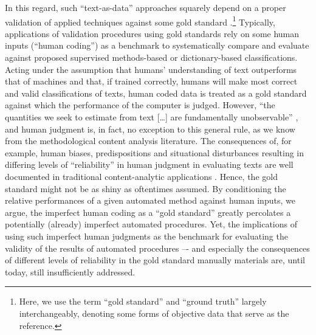 \documentclass[man, 12pt, a4paper, nolmodern, noextraspace]{apa6}
\begin{document}
    In this regard, such \enquote{text-as-data} approaches squarely depend on a proper validation of applied techniques against some gold standard \parencite{grimmer2013text}.\footnote{ Here, we use the term \enquote{gold standard} and \enquote{ground truth} largely interchangeably, denoting some forms of objective data that serve as the reference.} Typically, applications of validation procedures using gold standards rely on some human inputs (\enquote{human coding}) as a  benchmark to systematically compare and evaluate against proposed supervised methods-based or dictionary-based classifications. Acting under the assumption that humans’ understanding of text outperforms that of machines and that, if trained correctly, humans will make most correct and valid classifications of texts, human coded data is treated as a gold standard against which the performance of the computer is judged. However, “the quantities we seek to estimate from text [\ldots] are fundamentally unobservable” \parencite[p. 299]{lowe2013validating}, and human judgment is, in fact, no exception to this general rule, as we know from the methodological content analysis literature. The consequences of, for example, human biases, predispositions and situational disturbances resulting in differing levels of “reliability” in human judgment in evaluating texts are well documented in traditional content-analytic applications \parencite[e.g.,][]{krippendorff2004reliability, hayes2007answering, lombard2002content, ennser2018impact}. Hence, the gold standard might not be as shiny as oftentimes assumed. By conditioning the relative performances of a given automated method against human inputs, we argue, the imperfect human coding as a “gold standard” greatly percolates a potentially (already) imperfect automated procedures. Yet, the implications of using such imperfect human judgments as the benchmark for evaluating the validity of the results of automated procedures –- and especially the consequences of different levels of reliability in the gold standard manually materials are, until today, still insufficiently addressed.
    
\end{document}
